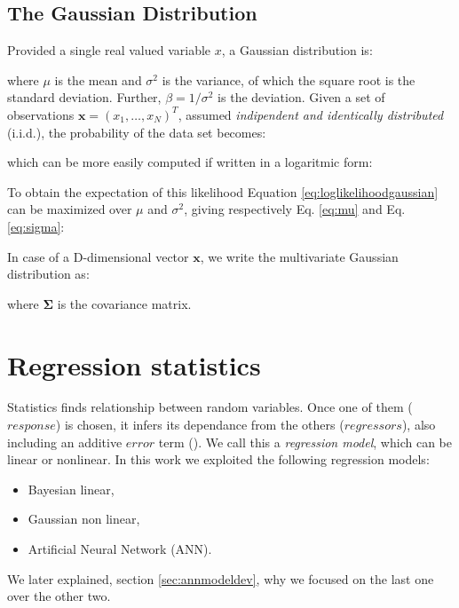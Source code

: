 \subsection{The Gaussian Distribution}
\label{subsec:gaussian}

Provided a single real valued variable $x$, a Gaussian distribution is:

where $\mu$ is the mean and $\sigma^2$ is the variance, of which the square root
is the standard deviation.
Further, $\beta = 1/\sigma^2$ is the deviation.
Given a set of observations $\mathbf{x} = (x_1, \ldots, x_N)^T$, assumed
\textit{indipendent and identically distributed} (i.i.d.), the probability of
the data set becomes:

which can be more easily computed if written in a logaritmic form:

To obtain the expectation of this likelihood Equation
\ref{eq:loglikelihoodgaussian} can be maximized over $\mu$ and $\sigma^2$,
giving respectively Eq. \ref{eq:mu} and Eq. \ref{eq:sigma}:


In case of a D-dimensional vector $\mathbf{x}$, we write the multivariate
Gaussian distribution as:

where $\mathbf{\Sigma}$ is the covariance matrix.


\section{Regression statistics}
\label{sec:regressionstatistics}

Statistics finds relationship between random variables.
Once one of them ($response$) is chosen, it infers its dependance from the
others ($regressors$), also including an additive $error$ term
(\citet{RefWorks:194}). We call this a \textit{regression model}, which can be
linear or nonlinear.
In this work we exploited the following regression models:
\begin{itemize}
  \item{Bayesian linear,}
  \item{Gaussian non linear,}
  \item{Artificial Neural Network (\acs{ANN}).}
\end{itemize}
We later explained, section \ref{sec:annmodeldev}, why we focused on the last
one over the other two.

